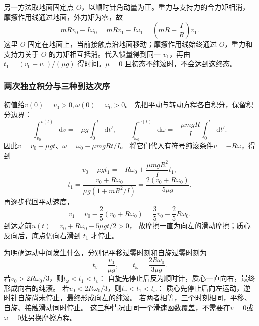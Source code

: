 \documentclass[UTF8,fontset=fandol,a4paper,11pt]{ctexart}
\newcommand{\dd}{\mathop{}\!\mathrm{d}}
\begin{document}
另一方法取地面固定点 $O$，以顺时针角动量为正。重力与支持力的合力矩相消，摩擦作用线通过地面，外力矩为零，故
\[
 mRv_0-I\omega_0=mRv_1-I\omega_1
 =\left(mR+\frac IR\right)v_1.
\]
这里 $O$ 固定在地面上，当前接触点沿地面移动；摩擦作用线始终通过 $O$，重力和支持力关于 $O$ 的力矩相互抵消。代入惯量得到同一 $v_1$，再由 $t_1=(v_0-v_1)/(\mu g)$ 得时间。$\mu=0$ 且初态不纯滚时，不会达到这终态。
\subsubsection*{两次独立积分与三种到达次序}
初值给$v(0)=v_0>0,\omega(0)=\omega_0>0$。
先把平动与转动方程各自积分，保留积分边界：
\[
\int_{v_0}^{v(t)}\dd v=-\mu g\int_0^t\dd t',
\qquad
\int_{\omega_0}^{\omega(t)}\dd\omega
=-\frac{\mu mgR}{I}\int_0^t\dd t'.
\]
因此$v=v_0-\mu gt$、$\omega=\omega_0-\mu mgRt/I$。
将它们代入有符号纯滚条件$v=-R\omega$，得到
\[
v_0-\mu gt_1=-R\omega_0+\frac{\mu mgR^2}{I}t_1,
\]
\[
t_1=\frac{v_0+R\omega_0}{\mu g(1+mR^2/I)}
=\frac{2(v_0+R\omega_0)}{5\mu g}.
\]
再逐步代回平动速度，
\[
v_1=v_0-\frac25(v_0+R\omega_0)
=\frac35v_0-\frac25R\omega_0.
\]
到达之前$u(t)=v_0+R\omega_0-5\mu gt/2>0$，
故摩擦一直为向左的滑动摩擦；质心反向后，底点仍向右滑到 $t_1$ 才停止。

为明确运动中间发生什么，分别记平移过零时刻和自旋过零时刻为
\[
t_v=\frac{v_0}{\mu g},\qquad
t_\omega=\frac{2R\omega_0}{3\mu g}.
\]
若$v_0>2R\omega_0/3$，则$t_\omega<t_1<t_v$：
自旋先停止后反为顺时针，质心一直向右，最终形成向右的纯滚。
若$v_0<2R\omega_0/3$，则$t_v<t_1<t_\omega$：
质心先停止后向左运动，逆时针自旋尚未停止，最终形成向左的纯滚。
若两者相等，三个时刻相同，平移、自旋、接触滑动同时停止。
这三种情况由同一个滑速函数覆盖，不需要在$v=0$或$\omega=0$处另换摩擦方程。
\end{document}
